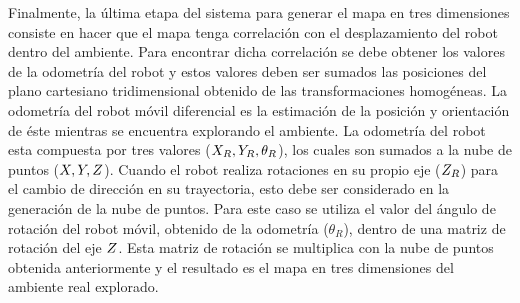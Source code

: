 Finalmente, la última etapa del sistema para generar el mapa en tres dimensiones consiste en 
hacer que el mapa tenga correlación con el desplazamiento del robot dentro del 
ambiente. Para encontrar dicha correlación se debe obtener los valores de la odometría
del robot y estos valores deben ser sumados las posiciones del plano cartesiano tridimensional 
obtenido de las transformaciones homogéneas. La odometría del robot móvil diferencial 
es la estimación de la posición y orientación de éste mientras se encuentra explorando 
el ambiente. La odometría del robot esta compuesta por tres valores 
($\mathnormal X_{R}, \mathnormal Y_{R}, \theta_{R}$), los cuales son sumados a la nube de puntos
($\mathnormal X, \mathnormal Y, \mathnormal Z$). Cuando el robot realiza rotaciones en su propio eje ($\mathnormal Z_{R}$) 
para el cambio de dirección en su trayectoria, esto debe ser considerado en la generación 
de la nube de puntos. Para este caso se utiliza el valor del ángulo de rotación del
robot móvil, obtenido de la odometría ($\theta_{R}$), dentro de una matriz de rotación del 
eje $\mathnormal Z$. Esta matriz de rotación se multiplica con la nube de puntos obtenida 
anteriormente y el resultado es el mapa en tres dimensiones del ambiente real 
explorado.



